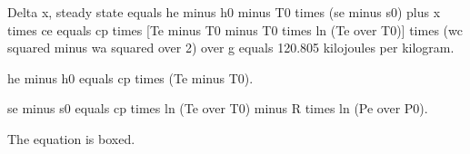 Delta x, steady state equals he minus h0 minus T0 times (se minus s0) plus x times ce equals cp times [Te minus T0 minus T0 times ln (Te over T0)] times (wc squared minus wa squared over 2) over g equals 120.805 kilojoules per kilogram.

he minus h0 equals cp times (Te minus T0).

se minus s0 equals cp times ln (Te over T0) minus R times ln (Pe over P0).

The equation is boxed.